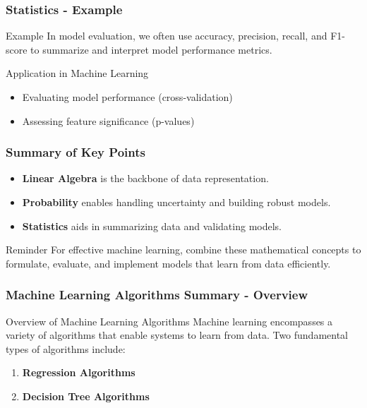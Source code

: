 \documentclass[aspectratio=169]{beamer}
\begin{document}
\begin{frame}[fragile]
    \frametitle{Statistics - Example}
    \begin{block}{Example}
        In model evaluation, we often use accuracy, precision, recall, and F1-score to summarize and interpret model performance metrics.
    \end{block}
    \begin{block}{Application in Machine Learning}
        \begin{itemize}
            \item Evaluating model performance (cross-validation)
            \item Assessing feature significance (p-values)
        \end{itemize}
    \end{block}
\end{frame}

\begin{frame}[fragile]
    \frametitle{Summary of Key Points}
    \begin{itemize}
        \item \textbf{Linear Algebra} is the backbone of data representation.
        \item \textbf{Probability} enables handling uncertainty and building robust models.
        \item \textbf{Statistics} aids in summarizing data and validating models.
    \end{itemize}
    \begin{block}{Reminder}
        For effective machine learning, combine these mathematical concepts to formulate, evaluate, and implement models that learn from data efficiently.
    \end{block}
\end{frame}

\begin{frame}[fragile]
    \frametitle{Machine Learning Algorithms Summary - Overview}
    \begin{block}{Overview of Machine Learning Algorithms}
        Machine learning encompasses a variety of algorithms that enable systems to learn from data. 
        Two fundamental types of algorithms include:
    \end{block}
    \begin{enumerate}
        \item \textbf{Regression Algorithms}
        \item \textbf{Decision Tree Algorithms}
    \end{enumerate}
\end{frame}
\end{document}

